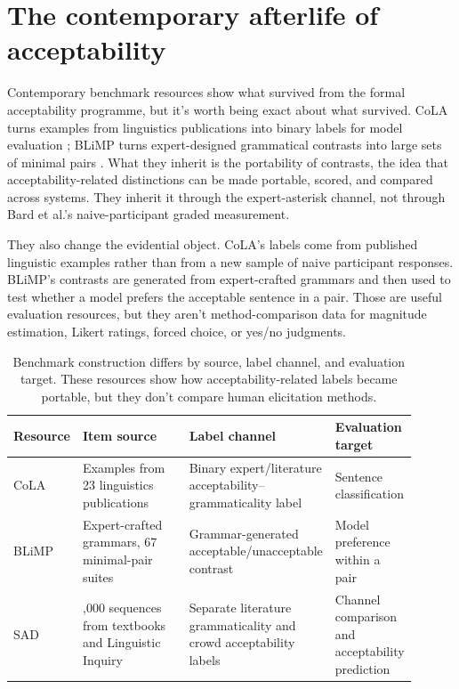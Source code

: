 \section{The contemporary afterlife of acceptability}

Contemporary benchmark resources show what survived from the formal
acceptability programme, but it's worth being exact about what survived. CoLA
turns examples from linguistics publications into binary labels for model
evaluation \citep{WarstadtEtAl2019CoLA}; BLiMP turns expert-designed
grammatical contrasts into large sets of minimal pairs
\citep{WarstadtEtAl2020}. What they inherit is the portability of contrasts,
the idea that acceptability-related distinctions can be made portable, scored,
and compared across systems. They inherit it through the expert-asterisk
channel, not through Bard et al.'s naive-participant graded measurement.

They also change the evidential object. CoLA's labels come from published
linguistic examples rather than from a new sample of naive participant
responses. BLiMP's contrasts are generated from expert-crafted grammars and
then used to test whether a model prefers the acceptable sentence in a pair.
Those are useful evaluation resources, but they aren't method-comparison data
for magnitude estimation, Likert ratings, forced choice, or yes/no judgments.

\begin{table}[H]
\centering
\small
\begin{tabular}{@{}>{\raggedright\arraybackslash}p{0.17\linewidth}>{\raggedright\arraybackslash}p{0.28\linewidth}>{\raggedright\arraybackslash}p{0.25\linewidth}>{\raggedright\arraybackslash}p{0.20\linewidth}@{}}
\toprule
Resource & Item source & Label channel & Evaluation target \\
\midrule
CoLA & Examples from 23 linguistics publications & Binary expert/literature acceptability--grammaticality label & Sentence classification \\
BLiMP & Expert-crafted grammars, 67 minimal-pair suites & Grammar-generated acceptable/unacceptable contrast & Model preference within a pair \\
SAD & 1,000 sequences from textbooks and Linguistic Inquiry & Separate literature grammaticality and crowd acceptability labels & Channel comparison and acceptability prediction \\
\bottomrule
\end{tabular}
\caption{Benchmark construction differs by source, label channel, and
evaluation target. These resources show how acceptability-related labels became
portable, but they don't compare human elicitation methods.}
\label{tab:benchmark-afterlife}
\end{table}

